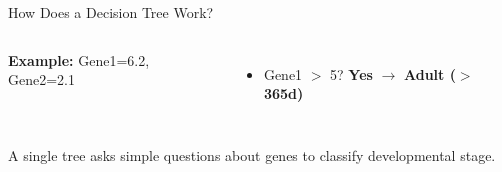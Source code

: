 \documentclass[aspectratio=169, 11pt, t]{beamer}
\begin{document}
\begin{frame}{How Does a Decision Tree Work?}
\begin{columns}[T]
            \vspace{0.3em}
            {\small\textbf{Example:} Gene1=6.2, Gene2=2.1}
            \vspace{0.2em}
            {\small
            \begin{itemize}\setlength{\itemsep}{0pt}
                \item Gene1 $>$ 5? \textcolor{green!50!black}{\textbf{Yes}} $\rightarrow$ \textbf{Adult ($>$365d)}
            \end{itemize}}
    \end{columns}
    
    \vspace{0.2cm}
    \begin{center}
        \color{CardiffDarkGrey}\scriptsize
        A single tree asks simple questions about genes to classify developmental stage.
    \end{center}
\end{frame}
\end{document}
